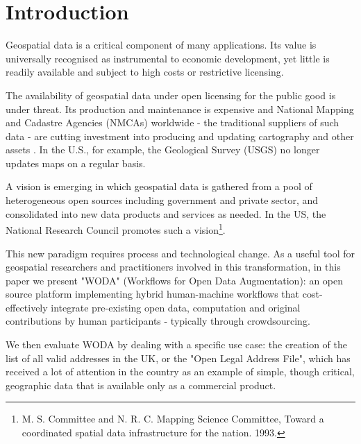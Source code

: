 \section{Introduction}

Geospatial data is a critical component of many applications. Its value is universally recognised as instrumental to economic development, yet little is readily available and subject to high costs or restrictive licensing. 

The availability of geospatial data under open licensing for the public good is under threat. Its production and maintenance is expensive and National Mapping and Cadastre Agencies (NMCAs) worldwide - the traditional suppliers of such data - are cutting investment into producing and updating cartography and other assets \cite{ESTES:1994vz}. In the U.S., for example, the Geological Survey (USGS) no longer updates maps on a regular basis. 

A vision is emerging in which geospatial data is gathered from a pool of heterogeneous open sources including government and private sector, and consolidated into new data products and services as needed. In the US, the National Research Council promotes such a vision\footnote{M. S. Committee and N. R. C. Mapping Science Committee, Toward a coordinated spatial data infrastructure for the nation. 1993.}.

This new paradigm requires process and technological change. As a useful tool for geospatial researchers and practitioners involved in this transformation, in this paper we present "WODA" (Workflows for Open Data Augmentation): an open source platform implementing hybrid human-machine workflows that cost-effectively integrate pre-existing open data, computation and original contributions by human participants - typically through crowdsourcing. 

We then evaluate WODA by dealing with a specific use case: the creation of the list of all valid addresses in the UK, or the "Open Legal Address File", which has received a lot of attention in the country as an example of simple, though critical, geographic data that is available only as a commercial product.
